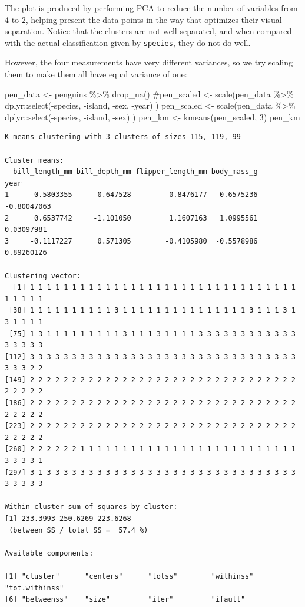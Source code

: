 \documentclass[
  letterpaper,
  DIV=11,
  numbers=noendperiod]{scrreprt}
\newenvironment{Shaded}{\begin{snugshade}}{\end{snugshade}}
\newcommand{\CommentTok}[1]{\textcolor[rgb]{0.37,0.37,0.37}{#1}}
\newcommand{\DecValTok}[1]{\textcolor[rgb]{0.68,0.00,0.00}{#1}}
\newcommand{\FunctionTok}[1]{\textcolor[rgb]{0.28,0.35,0.67}{#1}}
\newcommand{\NormalTok}[1]{\textcolor[rgb]{0.00,0.23,0.31}{#1}}
\newcommand{\OtherTok}[1]{\textcolor[rgb]{0.00,0.23,0.31}{#1}}
\newcommand{\SpecialCharTok}[1]{\textcolor[rgb]{0.37,0.37,0.37}{#1}}
\begin{document}
The plot is produced by performing PCA to reduce the number of variables
from 4 to 2, helping present the data points in the way that optimizes
their visual separation. Notice that the clusters are not well
separated, and when compared with the actual classification given by
\texttt{species}, they do not do well.

However, the four measurements have very different variances, so we try
scaling them to make them all have equal variance of one:

\begin{Shaded}
\begin{Highlighting}[]
\NormalTok{pen\_data }\OtherTok{\textless{}{-}}\NormalTok{ penguins }\SpecialCharTok{\%\textgreater{}\%} \FunctionTok{drop\_na}\NormalTok{()}
\CommentTok{\#pen\_scaled \textless{}{-} scale(pen\_data \%\textgreater{}\% dplyr::select({-}species, {-}island, {-}sex, {-}year) )}
\NormalTok{pen\_scaled }\OtherTok{\textless{}{-}} \FunctionTok{scale}\NormalTok{(pen\_data }\SpecialCharTok{\%\textgreater{}\%}\NormalTok{ dplyr}\SpecialCharTok{::}\FunctionTok{select}\NormalTok{(}\SpecialCharTok{{-}}\NormalTok{species, }\SpecialCharTok{{-}}\NormalTok{island, }\SpecialCharTok{{-}}\NormalTok{sex) )}
\NormalTok{pen\_km }\OtherTok{\textless{}{-}} \FunctionTok{kmeans}\NormalTok{(pen\_scaled, }\DecValTok{3}\NormalTok{)}
\NormalTok{pen\_km}
\end{Highlighting}
\end{Shaded}

\begin{verbatim}
K-means clustering with 3 clusters of sizes 115, 119, 99

Cluster means:
  bill_length_mm bill_depth_mm flipper_length_mm body_mass_g        year
1     -0.5803355      0.647528        -0.8476177  -0.6575236 -0.80047063
2      0.6537742     -1.101050         1.1607163   1.0995561  0.03097981
3     -0.1117227      0.571305        -0.4105980  -0.5578986  0.89260126

Clustering vector:
  [1] 1 1 1 1 1 1 1 1 1 1 1 1 1 1 1 1 1 1 1 1 1 1 1 1 1 1 1 1 1 1 1 1 1 1 1 1 1
 [38] 1 1 1 1 1 1 1 1 1 1 3 1 1 1 1 1 1 1 1 1 1 1 1 1 1 1 3 1 1 1 3 1 3 1 1 1 1
 [75] 1 3 1 1 1 1 1 1 1 1 1 3 1 1 1 3 1 1 1 1 3 3 3 3 3 3 3 3 3 3 3 3 3 3 3 3 3
[112] 3 3 3 3 3 3 3 3 3 3 3 3 3 3 3 3 3 3 3 3 3 3 3 3 3 3 3 3 3 3 3 3 3 3 3 2 2
[149] 2 2 2 2 2 2 2 2 2 2 2 2 2 2 2 2 2 2 2 2 2 2 2 2 2 2 2 2 2 2 2 2 2 2 2 2 2
[186] 2 2 2 2 2 2 2 2 2 2 2 2 2 2 2 2 2 2 2 2 2 2 2 2 2 2 2 2 2 2 2 2 2 2 2 2 2
[223] 2 2 2 2 2 2 2 2 2 2 2 2 2 2 2 2 2 2 2 2 2 2 2 2 2 2 2 2 2 2 2 2 2 2 2 2 2
[260] 2 2 2 2 2 2 1 1 1 1 1 1 1 1 1 1 1 1 1 1 1 1 1 1 1 1 1 1 1 1 1 1 3 3 3 3 1
[297] 3 1 3 3 3 3 3 3 3 3 3 3 3 3 3 3 3 3 3 3 3 3 3 3 3 3 3 3 3 3 3 3 3 3 3 3 3

Within cluster sum of squares by cluster:
[1] 233.3993 250.6269 223.6268
 (between_SS / total_SS =  57.4 %)

Available components:

[1] "cluster"      "centers"      "totss"        "withinss"     "tot.withinss"
[6] "betweenss"    "size"         "iter"         "ifault"      
\end{verbatim}
\end{document}
